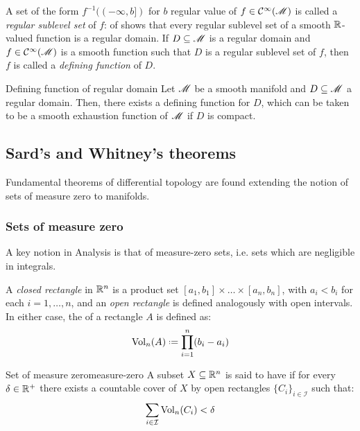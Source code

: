 A set of the form $ f^{-1}((-\infty,b]) $ for $ b $ regular value of $ f \in \mathcal{C}^{\infty}(\mathscr{M}) $ is called a \emph{regular sublevel set} of $ f $:  of  shows that every regular sublevel set of a smooth $ \mathbb{R} $-valued function is a regular domain. If $ D \subseteq \mathscr{M} $ is a regular domain and $ f \in \mathcal{C}^{\infty}(\mathscr{M}) $ is a smooth function such that $ D $ is a regular sublevel set of $ f $, then $ f $ is called a \emph{defining function} of $ D $.

\begin{theorem}{Defining function of regular domain}{}
  Let $ \mathscr{M} $ be a smooth manifold and $ D \subseteq \mathscr{M} $ a regular domain. Then, there exists a defining function for $ D $, which can be taken to be a smooth exhaustion function of $ \mathscr{M} $ if $ D $ is compact.
\end{theorem}

\subsection{Sard's and Whitney's theorems}

Fundamental theorems of differential topology are found extending the notion of sets of measure zero to manifolds.

\subsubsection{Sets of measure zero}

A key notion in Analysis is that of measure-zero sets, i.e. sets which are negligible in integrals.

A \emph{closed rectangle} in $ \mathbb{R}^n $ is a product set $ [a_1 , b_1] \times \dots \times [a_n , b_n] $, with $ a_i < b_i $ for each $ i = 1 , \dots , n $, and an \emph{open rectangle} is defined analogously with open intervals. In either case, the  of a rectangle $ A $ is defined as:
\begin{equation}
  \Vol_n(A) \defeq \prod_{i = 1}^n (b_i - a_i)
\end{equation}

\begin{definition}{Set of measure zero}{measure-zero}
  A subset $ X \subseteq \mathbb{R}^n $ is said to have  if for every $ \delta \in \mathbb{R}^+ $ there exists a countable cover of $ X $ by open rectangles $ \{C_i\}_{i \in \mathcal{I}} $ such that:
  \begin{equation}
    \sum_{i \in \mathcal{I}} \operatorname{Vol}_n(C_i) < \delta
  \end{equation}
\end{definition}

